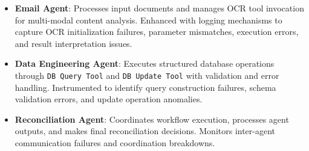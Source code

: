 \documentclass[conference]{IEEEtran}
\begin{document}
\begin{itemize}
\item \textbf{Email Agent}: Processes input documents and manages OCR tool invocation for multi-modal content analysis. Enhanced with logging mechanisms to capture OCR initialization failures, parameter mismatches, execution errors, and result interpretation issues.

\item \textbf{Data Engineering Agent}: Executes structured database operations through \texttt{DB Query Tool} and \texttt{DB Update Tool} with validation and error handling. Instrumented to identify query construction failures, schema validation errors, and update operation anomalies.

\item \textbf{Reconciliation Agent}: Coordinates workflow execution, processes agent outputs, and makes final reconciliation decisions. Monitors inter-agent communication failures and coordination breakdowns.
\end{itemize}


    
    
    
\end{document}
